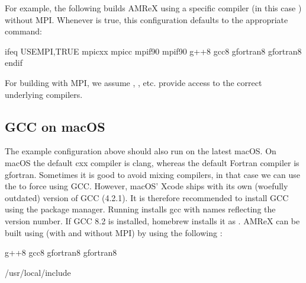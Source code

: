 \documentclass[letterpaper,10pt,english]{sphinxmanual}
\begin{document}
\sphinxAtStartPar
For example, the following  builds AMReX
using a specific compiler (in this case ) without MPI. Whenever
  is true, this configuration defaults to the appropriate
 command:

\begin{sphinxVerbatim}[commandchars=\\\{\}]
ifeq USE\PYGZus{}MPI,TRUE
    mpicxx
     mpicc
     mpif90
    mpif90
    g++\PYGZhy{}8
     gcc\PYGZhy{}8
     gfortran\PYGZhy{}8
    gfortran\PYGZhy{}8
endif
\end{sphinxVerbatim}

\sphinxAtStartPar
For building with MPI, we assume , , etc. provide access to
the correct underlying compilers.


\subsection{GCC on macOS}
\label{\detokenize{BuildingAMReX:gcc-on-macos}}\label{\detokenize{BuildingAMReX:sec-build-macos}}
\sphinxAtStartPar
The example configuration above should also run on the latest macOS. On macOS
the default cxx compiler is clang, whereas the default Fortran compiler is
gfortran. Sometimes it is good to avoid mixing compilers, in that case we can
use the  to force using GCC. However, macOS’ Xcode ships with its
own (woefully outdated) version of GCC (4.2.1). It is therefore recommended to
install GCC using the  package manager. Running
 installs gcc with names reflecting the version number. If
GCC 8.2 is installed, homebrew installs it as . AMReX can be built
using  (with and without MPI) by using the following
:

\begin{sphinxVerbatim}[commandchars=\\\{\}]
  g++\PYGZhy{}8
   gcc\PYGZhy{}8
   gfortran\PYGZhy{}8
  gfortran\PYGZhy{}8

  /usr/local/include
\end{sphinxVerbatim}
\end{document}

